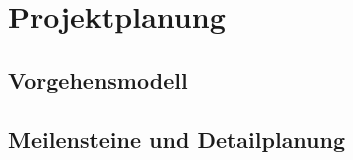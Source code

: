 
\chapter{Projektplanung}


\section{Vorgehensmodell}



\section{Meilensteine und Detailplanung} \label{sec:meilen}



